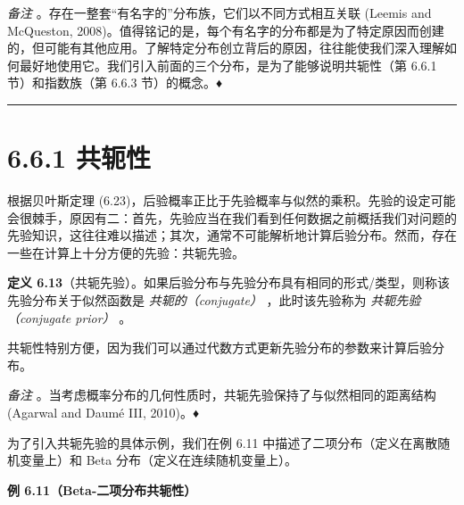 \emph{备注} 。存在一整套“有名字的”分布族，它们以不同方式相互关联 (Leemis and McQueston, 2008)。值得铭记的是，每个有名字的分布都是为了特定原因而创建的，但可能有其他应用。了解特定分布创立背后的原因，往往能使我们深入理解如何最好地使用它。我们引入前面的三个分布，是为了能够说明共轭性（第 6.6.1 节）和指数族（第 6.6.3 节）的概念。♦

\medskip\hrule\medskip

\section*{6.6.1 共轭性}

根据贝叶斯定理 (6.23)，后验概率正比于先验概率与似然的乘积。先验的设定可能会很棘手，原因有二：首先，先验应当在我们看到任何数据之前概括我们对问题的先验知识，这往往难以描述；其次，通常不可能解析地计算后验分布。然而，存在一些在计算上十分方便的先验：共轭先验。

\textbf{定义 6.13}（共轭先验）。如果后验分布与先验分布具有相同的形式/类型，则称该先验分布关于似然函数是 \emph{共轭的（conjugate）} ，此时该先验称为 \emph{共轭先验（conjugate prior）} 。

共轭性特别方便，因为我们可以通过代数方式更新先验分布的参数来计算后验分布。

\emph{备注} 。当考虑概率分布的几何性质时，共轭先验保持了与似然相同的距离结构 (Agarwal and Daumé III, 2010)。♦

为了引入共轭先验的具体示例，我们在例 6.11 中描述了二项分布（定义在离散随机变量上）和 Beta 分布（定义在连续随机变量上）。

\begin{notebox}
\textbf{例 6.11（Beta-二项分布共轭性）}
\end{notebox}

